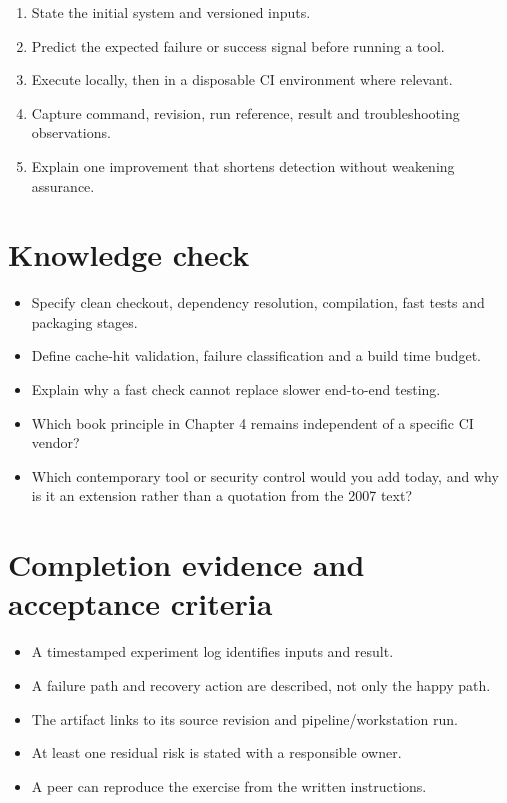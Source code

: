 \documentclass[11pt,letterpaper]{article}
\begin{document}
\begin{enumerate}
\item State the initial system and versioned inputs.
\item Predict the expected failure or success signal before running a tool.
\item Execute locally, then in a disposable CI environment where relevant.
\item Capture command, revision, run reference, result and troubleshooting observations.
\item Explain one improvement that shortens detection without weakening assurance.
\end{enumerate}
\section{Knowledge check}
\begin{itemize}
\item Specify clean checkout, dependency resolution, compilation, fast tests and packaging stages.
\item Define cache-hit validation, failure classification and a build time budget.
\item Explain why a fast check cannot replace slower end-to-end testing.
\item Which book principle in Chapter 4 remains independent of a specific CI vendor?
\item Which contemporary tool or security control would you add today, and why is it an extension rather than a quotation from the 2007 text?
\end{itemize}
\section{Completion evidence and acceptance criteria}
\begin{itemize}
\item A timestamped experiment log identifies inputs and result.
\item A failure path and recovery action are described, not only the happy path.
\item The artifact links to its source revision and pipeline/workstation run.
\item At least one residual risk is stated with a responsible owner.
\item A peer can reproduce the exercise from the written instructions.
\end{itemize}
\end{document}
